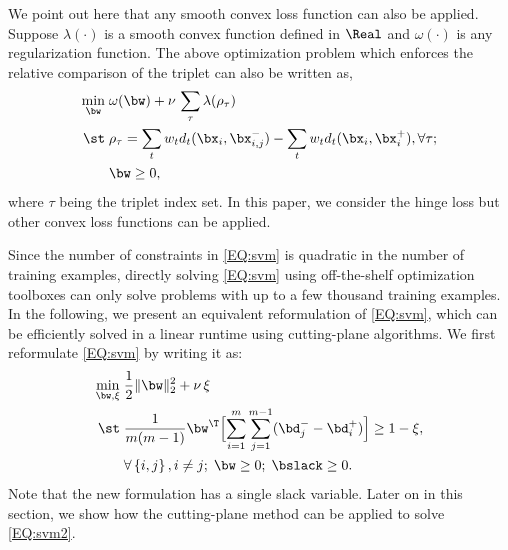 \documentclass[10pt,twocolumn,letterpaper]{article}
\def\bxi{{\bx_i}}
\def\bxip{{\bx_i^{+}}}
\def\bxijm{{\bx_{i,j}^{-}}}
\def\bdip{{\bd_{i}^{+}}}
\def\bdjm{{\bd_{j}^{-}}}
\begin{document}
We point out here that any smooth convex loss function can also be applied.
Suppose $\lambda(\cdot)$ is a smooth convex function defined in $\Real$
and $\omega(\cdot)$ is any regularization function.
The above optimization problem which enforces the relative comparison
of the triplet can also be written as,
\begin{align}
    \label{EQ:eq2}
        \min_{ \bw }   \;
        &
        \omega( \bw ) + \nu \, \sum_{\tau} \lambda( \rho_{\tau} )    \\ \notag
        \st \; &
        \rho_{\tau} = \sum_t w_t d_t(\bxi,\bxijm) - \sum_{t} w_t d_t(\bxi,\bxip), \forall \tau ;
            \\ \notag
        \; &
        \bw \geq 0,
\end{align}
where $\tau$ being the triplet index set.
In this paper, we consider the hinge loss but other convex loss
functions \cite{Teo2007Scalable} can be applied.


Since the number of constraints in \eqref{EQ:svm}
is quadratic in the number of training examples,
directly solving \eqref{EQ:svm} using off-the-shelf
optimization toolboxes can only solve problems with up to
a few thousand training examples.
In the following, we present an equivalent reformulation of \eqref{EQ:svm},
which can be efficiently solved in a linear runtime using
cutting-plane algorithms.
We first reformulate \eqref{EQ:svm} by writing it as:
\begin{align}
    \label{EQ:svm2}
        \min_{ \bw, \xi }   \;
        &
         \frac{1}{2} \| \bw  \|_{2}^{2} + \nu \,  \xi   \\ \notag
        \st \; &
        \frac{1}{m(m-1)} \bw^\T \Bigl[ \sum_{i=1}^m \sum_{j=1}^{m-1}
                ( \bdjm - \bdip ) \Bigr] \geq 1 - \xi,
            \\ \notag
        \; &
        \forall \left\{i,j\right\}, i \neq j ; \; \bw \geq 0; \; \bslack \geq 0.
\end{align}
Note that the new formulation has a single slack variable.
Later on in this section, we show how the cutting-plane method
can be applied to solve \eqref{EQ:svm2}.
\end{document}
